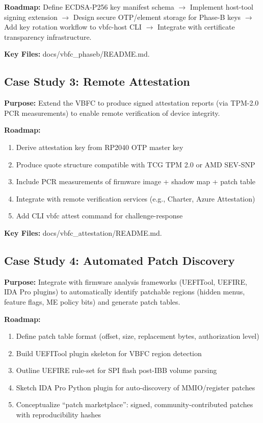 \documentclass[11pt,a4paper,oneside]{article}
\begin{document}
\textbf{Roadmap:} Define ECDSA-P256 key manifest schema $\rightarrow$ Implement host-tool signing extension $\rightarrow$ Design secure OTP/element storage for Phase-B keys $\rightarrow$ Add key rotation workflow to vbfc-host CLI $\rightarrow$ Integrate with certificate transparency infrastructure.

\textbf{Key Files:} docs/vbfc_phaseb/README.md.

\subsection{Case Study 3: Remote Attestation}
\textbf{Purpose:} Extend the VBFC to produce signed attestation reports (via TPM-2.0 PCR measurements) to enable remote verification of device integrity.

\textbf{Roadmap:}
\begin{enumerate}
  \item Derive attestation key from RP2040 OTP master key
  \item Produce quote structure compatible with TCG TPM 2.0 or AMD SEV-SNP
  \item Include PCR measurements of firmware image + shadow map + patch table
  \item Integrate with remote verification services (e.g., Charter, Azure Attestation)
  \item Add CLI vbfc attest command for challenge-response
\end{enumerate}

\textbf{Key Files:} docs/vbfc_attestation/README.md.

\subsection{Case Study 4: Automated Patch Discovery}
\textbf{Purpose:} Integrate with firmware analysis frameworks (UEFITool, UEFIRE, IDA Pro plugins) to automatically identify patchable regions (hidden menus, feature flags, ME policy bits) and generate patch tables.

\textbf{Roadmap:}
\begin{enumerate}
  \item Define patch table format (offset, size, replacement bytes, authorization level)
  \item Build UEFITool plugin skeleton for VBFC region detection
  \item Outline UEFIRE rule-set for SPI flash post-IBB volume parsing
  \item Sketch IDA Pro Python plugin for auto-discovery of MMIO/register patches
  \item Conceptualize ``patch marketplace'': signed, community-contributed patches with reproducibility hashes
\end{enumerate}
\end{document}
